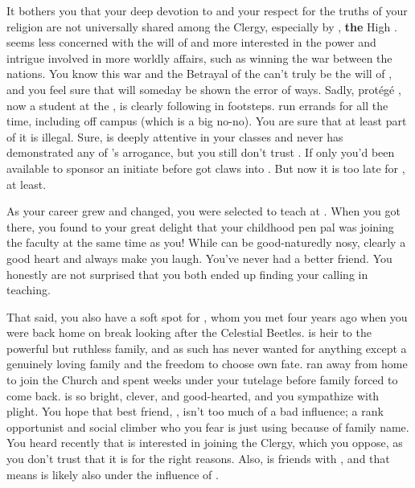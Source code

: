 \documentclass[char]{GL2020}
\begin{document}
It bothers you that your deep devotion to \cTechGod{} and your respect for the truths of your religion are not universally shared among the Clergy, especially by \cAntiChup{\intro}, \textbf{the} High \cAntiChup{\Cleric}. \cAntiChup{} seems less concerned with the will of \cTechGod{} and more interested in the power and intrigue involved in more worldly affairs, such as winning the war between the nations. You know this war and the Betrayal of the \pShippies{} can't truly be the will of \cTechGod{}, and you feel sure that \cAntiChup{} will someday be shown the error of \cAntiChup{\their} ways. Sadly, \cAntiChup{\their} protégé \cScholarship{\intro}, now a student at the \pSchool{}, is clearly following in \cAntiChup{\their} footsteps. \cScholarship{\They} run\cScholarship{\verbs} errands for \cAntiChup{} all the time, including off campus (which is a big no-no). You are sure that at least part of it is illegal. Sure, \cScholarship{} is deeply attentive in your classes and never has demonstrated any of \cAntiChup{}’s arrogance, but you still don’t trust \cScholarship{\them}. If only you'd been available to sponsor an initiate before \cAntiChup{} got \cAntiChup{\their} claws into \cScholarship{}. But now it is too late for \cScholarship{}, at least.

As your career grew and changed, you were selected to teach at \pSchool{}. When you got there, you found to your great delight that your childhood pen pal \cMusic{} was joining the faculty at the same time as you! While \cMusic{} can be good-naturedly nosy, \cMusic{\they} clearly \cMusic{\have} a good heart and always make\cMusic{\verbs} you laugh. You've never had a better friend. You honestly are not surprised that you both ended up finding your calling in teaching.

That said, you also have a soft spot for \cHeir{\intro}, whom you met four years ago when you were back home on break looking after the Celestial Beetles. \cHeir{} is heir to the powerful but ruthless \cHeir{\formal} family, and as such has never wanted for anything except a genuinely loving family and the freedom to choose \cHeir{\their} own fate. \cHeir{\They} ran away from home to join the Church and spent weeks under your tutelage before \cHeir{\their} family forced \cHeir{\them} to come back. \cHeir{} is so bright, clever, and good-hearted, and you sympathize with \cHeir{\their} plight. You hope that \cHeir{\their} best friend, \cAmbition{\intro}, isn't too much of a bad influence; \cAmbition{\theyare} a rank opportunist and social climber who you fear is just using \cHeir{} because of \cHeir{\their} family name. You heard recently that \cAmbition{} is interested in joining the Clergy, which you oppose, as you don't trust that it is for the right reasons. Also, \cAmbition{} is friends with \cScholarship{}, and that means \cAmbition{} is likely also under the influence of \cAntiChup{}.
\end{document}
